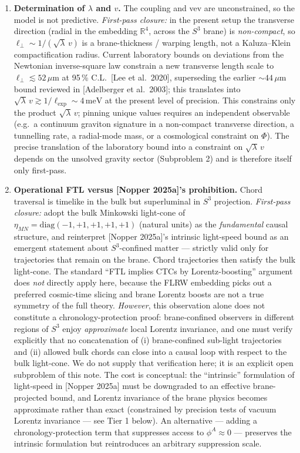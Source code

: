 \documentclass[11pt,a4paper]{article}
\begin{document}
\begin{enumerate}[leftmargin=*]
\item \textbf{Determination of $\lambda$ and $v$.} The coupling and vev are unconstrained, so the model is not predictive. \emph{First-pass closure:} in the present setup the transverse direction (radial in the embedding $\mathbb{R}^4$, across the $S^3$ brane) is \emph{non-compact}, so $\ell_\perp\sim1/(\sqrt{\lambda}\,v)$ is a brane-thickness / warping length, not a Kaluza--Klein compactification radius. Current laboratory bounds on deviations from the Newtonian inverse-square law constrain a new transverse length scale to $\ell_\perp \lesssim 52\,\mu\mathrm{m}$ at 95\,\% C.L.\ [Lee et al.\ 2020], superseding the earlier $\sim 44\,\mu\mathrm{m}$ bound reviewed in [Adelberger et al.\ 2003]; this translates into $\sqrt{\lambda}\,v\gtrsim 1/\ell_{\exp}\sim 4\,\mathrm{meV}$ at the present level of precision. This constrains only the product $\sqrt{\lambda}\,v$; pinning unique values requires an independent observable (e.g.\ a continuum graviton signature in a non-compact transverse direction, a tunnelling rate, a radial-mode mass, or a cosmological constraint on $\Phi$). The precise translation of the laboratory bound into a constraint on $\sqrt{\lambda}\,v$ depends on the unsolved gravity sector (Subproblem 2) and is therefore itself only first-pass.

\item \textbf{Operational FTL versus [Nopper 2025a]'s prohibition.} Chord traversal is timelike in the bulk but superluminal in $S^3$ projection. \emph{First-pass closure:} adopt the bulk Minkowski light-cone of $\eta_{MN}=\mathrm{diag}(-1,+1,+1,+1,+1)$ (natural units) as the \emph{fundamental} causal structure, and reinterpret [Nopper 2025a]'s intrinsic light-speed bound as an emergent statement about $S^3$-confined matter --- strictly valid only for trajectories that remain on the brane. Chord trajectories then satisfy the bulk light-cone. The standard ``FTL implies CTCs by Lorentz-boosting'' argument does \emph{not} directly apply here, because the FLRW embedding picks out a preferred cosmic-time slicing and brane Lorentz boosts are not a true symmetry of the full theory. \emph{However}, this observation alone does not constitute a chronology-protection proof: brane-confined observers in different regions of $S^3$ enjoy \emph{approximate} local Lorentz invariance, and one must verify explicitly that no concatenation of (i) brane-confined sub-light trajectories and (ii) allowed bulk chords can close into a causal loop with respect to the bulk light-cone. We do not supply that verification here; it is an explicit open subproblem of this note. The cost is conceptual: the ``intrinsic'' formulation of light-speed in [Nopper 2025a] must be downgraded to an effective brane-projected bound, and Lorentz invariance of the brane physics becomes approximate rather than exact (constrained by precision tests of vacuum Lorentz invariance --- see Tier 1 below). An alternative --- adding a chronology-protection term that suppresses access to $\phi^A\approx0$ --- preserves the intrinsic formulation but reintroduces an arbitrary suppression scale.


\end{enumerate}
\end{document}
